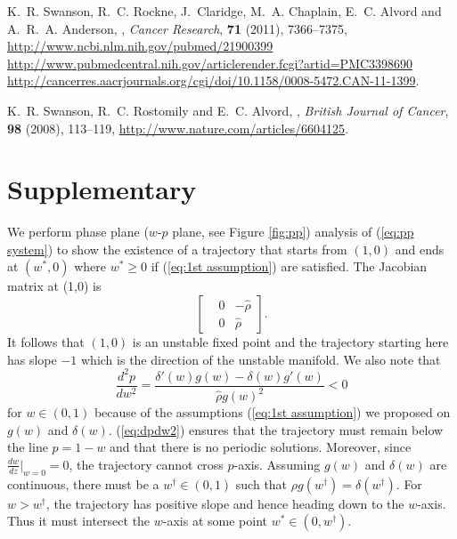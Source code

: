 \documentclass{aims}
\numberwithin{equation}{section}
\begin{document}
\begin{thebibliography}{10}
\newblock K.~R. Swanson, R.~C. Rockne, J.~Claridge, M.~A. Chaplain, E.~C.
  Alvord and A.~R.~A. Anderson,
,
\newblock \emph{Cancer Research}, \textbf{71} (2011), 7366--7375,
\newblock \urlprefix\url{http://www.ncbi.nlm.nih.gov/pubmed/21900399
  http://www.pubmedcentral.nih.gov/articlerender.fcgi?artid=PMC3398690
  http://cancerres.aacrjournals.org/cgi/doi/10.1158/0008-5472.CAN-11-1399}.

\newblock K.~R. Swanson, R.~C. Rostomily and E.~C. Alvord,
,
\newblock \emph{British Journal of Cancer}, \textbf{98} (2008), 113--119,
\newblock \urlprefix\url{http://www.nature.com/articles/6604125}.

\end{thebibliography}



\section*{Supplementary}

We perform phase plane ($w$-$p$ plane, see Figure \ref{fig:pp}) analysis of (\ref{eq:pp system})
to show the existence of a trajectory that starts from $(1,0)$ and
ends at $(w^{*},0)$ where $w^{*}\ge0$ if (\ref{eq:1st assumption})
are satisfied. The Jacobian matrix at (1,0) is 
\begin{equation}
\begin{bmatrix}
 & 0 & -\hat{\rho}\\
 & 0 & \hat{\rho}
\end{bmatrix}.
\end{equation}
It follows that $(1,0)$ is an unstable fixed point
and the trajectory starting here has slope $-1$ which is the direction
of the unstable manifold. We also note that 
\begin{equation}\label{eq:dpdw2}
\frac{d^{2}p}{dw^{2}}=\frac{\delta'(w)g(w)-\delta(w)g'(w)}{\hat{\rho} g(w)^{2}}<0
\end{equation}
for $w\in(0,1)$ because of the assumptions (\ref{eq:1st assumption}) we proposed on $g(w)$ and $\delta(w)$.
(\ref{eq:dpdw2}) ensures that the trajectory must remain below the line $p=1-w$ and that there is no periodic solutions. Moreover, since $\frac{dw}{dz}\vert_{w=0}=0$, the trajectory cannot cross $p$-axis. 
Assuming $g(w)$ and $\delta(w)$ are continuous, there must be a
$w^{\dagger}\in(0,1)$ such that $\rho g(w^{\dagger})=\delta(w^{\dagger})$.
For $w>w^{\dagger}$, the trajectory has positive slope and hence
heading down to the $w$-axis.  Thus it must intersect the
$w$-axis at some point $w^{*}\in(0,w^{\dagger}).$ 
\end{document}
